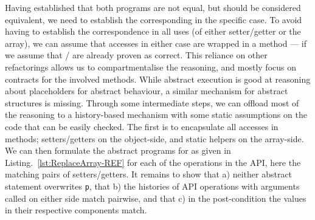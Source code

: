 Having established that both programs are not equal, but should be considered equivalent,
we need to establish the corresponding in the specific case.
To avoid having to establish the correspondence in all uses (of either setter/getter or the array),
we can assume that accesses in either case are wrapped in a method --- if we assume that / are already proven as correct.
This reliance on other refactorings allows us to compartmentalise the reasoning, and mostly focus on contracts for the involved methods.
While abstract execution is good at reasoning about placeholders for abstract behaviour, a similar mechanism for abstract structures is missing.
Through some intermediate steps, we can offload most of the reasoning to a history-based mechanism with some static assumptions on the code that can be easily checked.
The first is to encapsulate all accesses in methods; setters/getters on the object-side, and static helpers on the array-side.
We can then formulate the abstract programs for \Refinity{} as given in Listing.~\ref{lst:ReplaceArray-REF} for each of the operations in the API, here the matching pairs of setters/getters.
It remains to show that a) neither abstract statement overwrites \texttt{p}, that b) the histories of API operations with arguments called on either side match pairwise,
and that c) in the post-condition the values in their respective components match.





